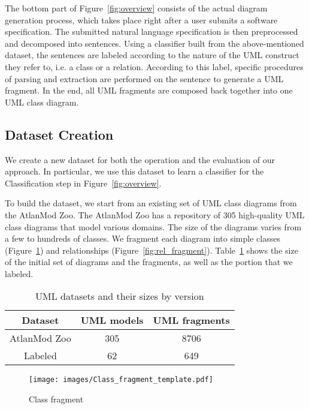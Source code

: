 \documentclass[sigconf]{acmart}
\begin{document}
The bottom part of Figure~\ref{fig:overview} consists of the actual diagram generation process, which takes place right after a user submits a software specification. The submitted natural language specification is then preprocessed and decomposed into sentences. Using a classifier built from the above-mentioned dataset, the sentences are labeled according to the nature of the UML construct they refer to, i.e. a class or a relation. According to this label, specific procedures of parsing and extraction are performed on the sentence to generate a UML fragment. In the end, all UML fragments are composed back together into one UML class diagram.

\subsection{Dataset Creation} \label{sec:data}
We create a new dataset for both the operation and the evaluation of our approach. In particular, we use this dataset to learn a classifier for the Classification step in Figure~\ref{fig:overview}.

To build the dataset, we start from an existing set of UML class diagrams from the AtlanMod Zoo. The AtlanMod Zoo has a repository of 305 high-quality UML class diagrams that model various domains. The size of the diagrams varies from a few to hundreds of classes. We fragment each diagram into simple classes (Figure~\ref{fig:class_fragment}) and relationships (Figure~\ref{fig:rel_fragment}). Table~\ref{tab:datasets} shows the size of the initial set of diagrams and the fragments, as well as the portion that we labeled.

\begin{table}[h]
    \centering
    \begin{tabular}{|c|c|c|}
        \hline
        Dataset & UML models & UML fragments \\ \hline
        AtlanMod Zoo & 305 & 8706 \\ \hline
        Labeled & 62 & 649 \\ \hline
    \end{tabular}
    \caption{UML datasets and their sizes by version}
    \label{tab:datasets}
\end{table}

\begin{figure}
    \centering
    \texttt{[image: images/Class\_fragment\_template.pdf]}
    \caption{Class fragment}
    \label{fig:class_fragment}
\end{figure}
\end{document}
